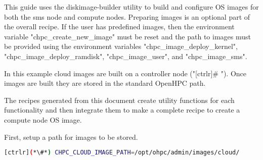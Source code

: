 

   This guide uses the diskimage-builder utility to build and configure OS images for both the sms node and compute nodes.  Preparing images is an optional part of the overall recipe. If the user has predefined images, then the environment variable "chpc\_create\_new\_image" must be reset and the path to images must be provided using the environment variables "chpc\_image\_deploy\_kernel", "chpc\_image\_deploy\_ramdisk", "chpc\_image\_user", and "chpc\_image\_sms". 

	In this example cloud images are built on a controller node ("[ctrlr]\# "). Once images are built they are stored in the standard OpenHPC path. 
	
	The recipes generated from this document create utility functions for each functionality and then integrate them to make a complete recipe to create a compute node OS image. 
	
	First, setup a path for images to be stored.


\begin{lstlisting}[language=bash,keywords={},upquote=true]
[ctrlr](*\#*) CHPC_CLOUD_IMAGE_PATH=/opt/ohpc/admin/images/cloud/
\end{lstlisting}
